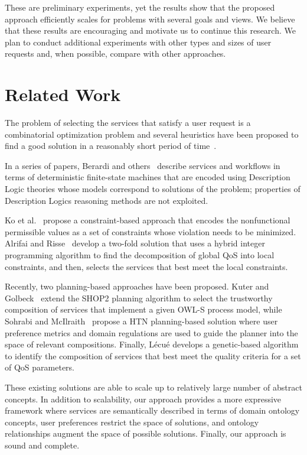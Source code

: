 \documentclass{llncs}
\begin{document}
These are preliminary experiments, yet the results show that the
proposed approach efficiently scales for problems with several goals
and views. We believe that these results are encouraging and motivate
us to continue this research. We plan to conduct additional experiments
with other types and sizes of user requests and, when possible, compare with
other approaches.


\section{Related Work}
The problem of selecting the services that satisfy a user request is a combinatorial
optimization problem and several heuristics have been proposed to find a good
solution in a reasonably short period of time~\cite{alrifaiR09,berardi08,myoung08,kuterG09,lecue09,rahmani08,sohrabiM09,Hiroshi2008}.

In a series of papers, Berardi and others~\cite{berardi05,berardi08,berardi06} 
describe services and workflows in terms of deterministic finite-state machines that are encoded using Description Logic theories whose models correspond to solutions of the problem; properties
of Description Logics reasoning methods are not exploited.

Ko et al.~\cite{myoung08} propose a constraint-based approach that encodes the nonfunctional
permissible values as a set of constraints whose violation needs to be
minimized. Alrifai and Risse~\cite{alrifaiR09} develop a two-fold solution that uses a hybrid
integer programming algorithm to find the decomposition of global QoS into local
constraints, and then, selects the services that best meet the local constraints.

Recently, two planning-based approaches have been proposed. Kuter and
Golbeck~\cite{kuterG09} extend the SHOP2 planning algorithm to select the trustworthy
composition of services that implement a given OWL-S process model, while
Sohrabi and McIlraith~\cite{sohrabiM09} propose a HTN planning-based solution where user
preference metrics and domain regulations are used to guide the planner into
the space of relevant compositions. Finally, L\'ecu\'e \cite{lecue09}  develops a genetic-based
algorithm to identify the composition of services that best meet the quality
criteria for a set of QoS parameters.

These existing solutions are able to scale up to relatively large number of
abstract concepts. In addition to scalability, our approach provides a more expressive
framework where services are semantically described in terms of domain
ontology concepts, user preferences restrict the space of solutions, and ontology
relationships augment the space of possible solutions. Finally, our approach
is sound and complete.
\end{document}
